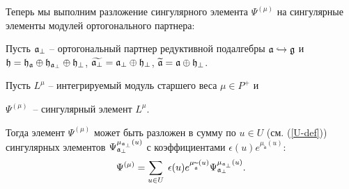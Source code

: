 \label{subsec:decomp-sing-element}

Теперь мы выполним разложение сингулярного элемента  $\Psi ^{\left(\mu \right) }$ на сингулярные элементы модулей ортогонального партнера:

\begin{lemma}

Пусть  $\frak{a}_{\bot }$ -- ортогональный партнер редуктивной подалгебры  $\frak{a}\hookrightarrow \frak{g}$ и $\frak{h}=\frak{\frak{h}_{\frak{a}}}\oplus \frak{h}_{\frak{a}_{\perp }}\oplus \frak{h}_{\perp }$, $\widetilde{%
\frak{a}_{\perp }}=\frak{a}_{\perp }\oplus \frak{h}_{\perp }$, $%
\widetilde{\frak{a}}=\frak{a}\oplus \frak{h}_{\perp }$.

Пусть $L^{\mu }$ -- интегрируемый модуль старшего веса  $\mu \in P^{+}$ и 

$\Psi ^{\left( \mu \right) }$\ -- сингулярный элемент $L^{\mu }$.

Тогда элемент  $\Psi ^{\left( \mu \right) }$ может быть разложен в сумму по  $u\in U$ (см. (\ref{U-def})) сингулярных элементов $\Psi _{\frak{a}_{\perp }}^{\mu _{\frak{a}_{\perp }}\left( u\right) }$ с коэффициентами
$\epsilon (u)e^{\mu _{\widetilde{\mathfrak{a}}}\left( u\right) }$:
\begin{equation}
\Psi ^{\left( \mu \right) }=\sum_{u\in U}\;\epsilon (u)e^{\mu _{\widetilde{%
\mathfrak{a}}}\left( u\right) }\Psi _{\frak{a}_{\perp }}^{\mu _{\frak{a}%
_{\perp }}\left( u\right) }.  \label{sing decomp main}
\end{equation}
\label{Psi-decomp-lemma}
\end{lemma}

